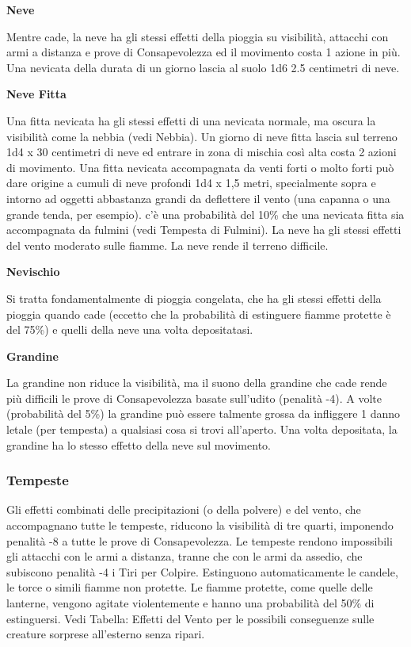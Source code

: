 \documentclass[a4paper,11pt,twoside,openany]{book}
\begin{document}
\textbf{Neve}

Mentre cade, la neve ha gli stessi effetti della pioggia su visibilità, attacchi con armi a distanza e prove di Consapevolezza ed il movimento costa 1 azione in più. Una nevicata della durata di un giorno lascia al suolo 1d6 \texttimes{} 2.5 centimetri di neve.

\textbf{Neve Fitta}

Una fitta nevicata ha gli stessi effetti di una nevicata normale, ma oscura la visibilità come la nebbia (vedi Nebbia). Un giorno di neve fitta lascia sul terreno 1d4 x 30 centimetri di neve ed entrare in zona di mischia così alta costa 2 azioni di movimento. Una fitta nevicata accompagnata da venti forti o molto forti può dare origine a cumuli di neve profondi 1d4 x 1,5 metri, specialmente sopra e intorno ad oggetti abbastanza grandi da deflettere il vento (una capanna o una grande tenda, per esempio).
c'è una probabilità del 10\% che una nevicata fitta sia accompagnata da fulmini (vedi Tempesta di Fulmini). La neve ha gli stessi effetti del vento moderato sulle fiamme. La neve rende il terreno difficile.

\textbf{Nevischio}

Si tratta fondamentalmente di pioggia congelata, che ha gli stessi effetti della pioggia quando cade (eccetto che la probabilità di estinguere fiamme protette è del 75\%) e quelli della neve una volta depositatasi.

\textbf{Grandine}

La grandine non riduce la visibilità, ma il suono della grandine che cade rende più difficili le prove di Consapevolezza basate sull'udito (penalità -4). A volte (probabilità del 5\%) la grandine può essere talmente grossa da infliggere 1 danno letale (per tempesta) a qualsiasi cosa si trovi all'aperto. Una volta depositata, la grandine ha lo stesso effetto della neve sul movimento.

\subsubsection{Tempeste}

\label{tempeste}

Gli effetti combinati delle precipitazioni (o della polvere) e del vento, che accompagnano tutte le tempeste, riducono la visibilità di tre quarti, imponendo penalità -8 a tutte le prove di Consapevolezza. Le tempeste rendono impossibili gli attacchi con le armi a distanza, tranne che con le armi da assedio, che subiscono penalità -4 i Tiri per Colpire.
Estinguono automaticamente le candele, le torce o simili fiamme non protette. Le fiamme protette, come quelle delle lanterne, vengono agitate violentemente e hanno una probabilità del 50\% di estinguersi. Vedi Tabella: Effetti del Vento per le possibili conseguenze sulle creature sorprese all'esterno senza ripari.
\end{document}
